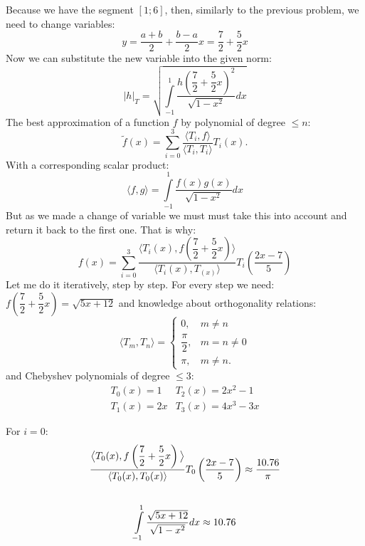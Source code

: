 \documentclass[12pt]{report}
\begin{document}
\begin{solution}
    Because we have the segment $[1;6]$, then, similarly to the previous problem, we need to change variables:
    \[
         y = \dfrac{a+b}{2} + \dfrac{b-a}{2}x = \dfrac{7}{2} + \dfrac{5}{2}x
    \]
    Now we can substitute the new variable into the given norm:
    \[
         |h|_T = \sqrt{\displaystyle \int\limits_{-1}^1\dfrac{h\left(\dfrac{7}{2} + \dfrac{5}{2}x\right)^2}{\sqrt{1-x^2}}dx}
    \]
    The best approximation of a function $f$ by polynomial of degree $\leq n$:
    \[
         \tilde{f}(x) = \sum\limits_{i=0}^3 \dfrac{\langle T_i, f \rangle}{\langle T_i, T_i \rangle} T_i(x).
    \]
    With a corresponding scalar product:
    \[
         \langle f, g \rangle = \int\limits_{-1}^1 \dfrac{f(x)g(x)}{\sqrt{1-x^2}}dx
    \]
    But as we made a change of variable we must must take this into account and return it back to the first one. That is why:
    \[
         f(x) = \sum\limits_{i=0}^3 \dfrac{\big\langle T_i(x), f\left(\dfrac{7}{2} + \dfrac{5}{2}x
         \right) \big\rangle}{\langle T_i(x), T_(x) \rangle} T_i\left(\dfrac{2x - 7}{5}\right)
    \]
    Let me do it iteratively, step by step. For every step we need: $f\left(\dfrac{7}{2} + \dfrac{5}{2}x\right) = \sqrt{5x+12}$ and knowledge about orthogonality relations:
    \[
         \langle T_m, T_n \rangle = \left\{
            \begin{array}{cc}
               0, & m\neq n\\
               \dfrac{\pi}{2}, & m=n\neq 0\\
               \pi, & m\neq n. 
            \end{array} 
         \right.
    \] 
    and Chebyshev polynomials of degree $\leq 3$:
    \[
      \begin{array}{cc}
         T_0(x) = 1 &  T_2(x) = 2x^2 - 1\\
         T_1(x) = 2x & T_3(x) = 4x^3 - 3x 
      \end{array}
    \]
    \par 
    For $i = 0$:
    \[
      \begin{array}{c}
         \displaystyle \dfrac{\big\langle T_0(x), f\left(\dfrac{7}{2} + \dfrac{5}{2}x\right) \big\rangle}{\langle T_0(x), T_0(x)\rangle} T_0 \left(\dfrac{2x-7}{5}\right) \approx \dfrac{10.76}{\pi}
         \\[1cm]
         \displaystyle 
         \int\limits_{-1}^1 \dfrac{\sqrt{5x+12}}{\sqrt{1-x^2}}dx \approx 10.76 \\
         \displaystyle
      \end{array}
\]
\end{solution}
\end{document}
